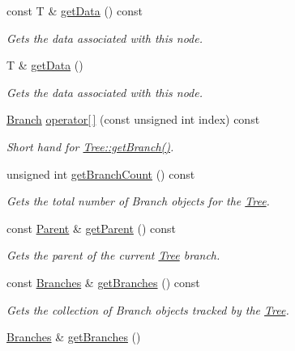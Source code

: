 \begin{DoxyCompactItemize}
const T \& \hyperlink{classTree_abb747015cccad9fe63fdef2139f98973}{get\+Data} () const 
\begin{DoxyCompactList}\small\item\em Gets the data associated with this node. \end{DoxyCompactList}\item 
T \& \hyperlink{classTree_ad006a9d1e418406d911de5ed2d401827}{get\+Data} ()
\begin{DoxyCompactList}\small\item\em Gets the data associated with this node. \end{DoxyCompactList}\item 
\hyperlink{classTree_a9acb980cd198358d57fb2a6e5d65c85b}{Branch} \hyperlink{classTree_a6fea09d40751b6d724ad22350c549595}{operator\mbox{[}$\,$\mbox{]}} (const unsigned int index) const 
\begin{DoxyCompactList}\small\item\em Short hand for \hyperlink{classTree_a3f6b272bfa9033ebad14879e520bf332}{Tree\+::get\+Branch()}. \end{DoxyCompactList}\item 
unsigned int \hyperlink{classTree_a957a719014644acd75703db27ee1f36b}{get\+Branch\+Count} () const 
\begin{DoxyCompactList}\small\item\em Gets the total number of Branch objects for the \hyperlink{classTree}{Tree}. \end{DoxyCompactList}\item 
const \hyperlink{classTree_a90c6da3cbc82d2a2652e7ceb19ef8f6a}{Parent} \& \hyperlink{classTree_ad3e326b9ab23e532db1ae94d58959b41}{get\+Parent} () const 
\begin{DoxyCompactList}\small\item\em Gets the parent of the current \hyperlink{classTree}{Tree} branch. \end{DoxyCompactList}\item 
const \hyperlink{classTree_abb3de7e9104700b780c956a6da8a3582}{Branches} \& \hyperlink{classTree_a190746e8449c28314dd74bc300ea2ddf}{get\+Branches} () const 
\begin{DoxyCompactList}\small\item\em Gets the collection of Branch objects tracked by the \hyperlink{classTree}{Tree}. \end{DoxyCompactList}\item 
\hyperlink{classTree_abb3de7e9104700b780c956a6da8a3582}{Branches} \& \hyperlink{classTree_a210da94166109a9d3cc7d73497771187}{get\+Branches} ()

\end{DoxyCompactItemize}
